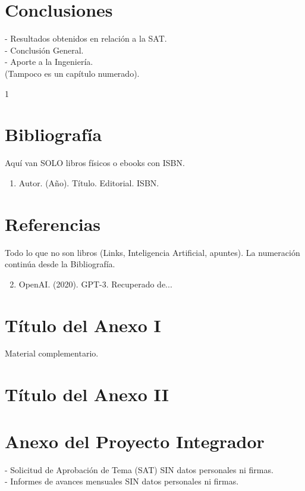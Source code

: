 \documentclass[11pt,a4paper,twoside]{report}
\begin{document}
	\chapter*{Conclusiones}
	- Resultados obtenidos en relación a la SAT. \\
	- Conclusión General. \\
	- Aporte a la Ingeniería. \\
	(Tampoco es un capítulo numerado).
	
	\clearpage
	\begin{spacing}{1} %
		\chapter*{Bibliografía}
		Aquí van SOLO libros físicos o ebooks con ISBN.
		\begin{enumerate}
			\item \setlength{\itemsep}{0.5\baselineskip} Autor. (Año). Título. Editorial. ISBN.
		\end{enumerate}
		
		\chapter*{Referencias}
		Todo lo que no son libros (Links, Inteligencia Artificial, apuntes). La numeración continúa desde la Bibliografía.
		\begin{enumerate}
			\setcounter{enumi}{1} %
			\item \setlength{\itemsep}{0.5\baselineskip} OpenAI. (2020). GPT-3. Recuperado de...
		\end{enumerate}
	\end{spacing}
	
	\appendix
	\chapter{Título del Anexo I}
	Material complementario.
	\chapter{Título del Anexo II}
	
	\chapter{Anexo del Proyecto Integrador}
	- Solicitud de Aprobación de Tema (SAT) SIN datos personales ni firmas. \\
	- Informes de avances mensuales SIN datos personales ni firmas.
	
\end{document}
